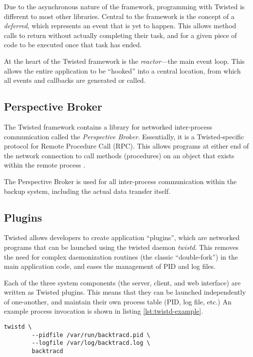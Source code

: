 Due to the asynchronous nature of the framework, programming with Twisted is
different to most other libraries. Central to the framework is the concept of
a \emph{deferred}, which represents an event that is yet to happen. This allows
method calls to return without actually completing their task, and for a given
piece of code to be executed once that task has ended.

At the heart of the Twisted framework is the \emph{reactor}---the main event
loop. This allows the entire application to be ``hooked'' into a central
location, from which all events and callbacks are generated or called.

\subsection{Perspective Broker}
\label{sec:implementation-twisted-pb}

The Twisted framework contains a library for networked inter-process
communication called the \emph{Perspective Broker}. Essentially, it is
a Twisted-specific protocol for Remote Procedure Call (RPC). This allows
programs at either end of the network connection to call methods (procedures)
on an object that exists within the remote process \cite{lefkowitz2003}.

The Perspective Broker is used for all inter-process communication within the
backup system, including the actual data transfer itself.

\subsection{Plugins}
\label{sec:implementation-twisted-plugins}

Twisted allows developers to create application ``plugins'', which are
networked programs that can be launched using the twisted daemon \emph{twistd}.
This removes the need for complex daemonization routines (the classic
``double-fork'') in the main application code, and eases the management of PID
and log files.

Each of the three system components (the server, client, and web interface) are
written as Twisted plugins. This means that they can be launched independently
of one-another, and maintain their own process table (PID, log file, etc.) An
example process invocation is shown in listing \ref{lst:twistd-example}.

\begin{singlespacing}
\begin{lstlisting}[caption=An example twistd invocation,
    label=lst:twistd-example]
    twistd \
        --pidfile /var/run/backtracd.pid \
        --logfile /var/log/backtracd.log \
        backtracd
\end{lstlisting}
\end{singlespacing}

